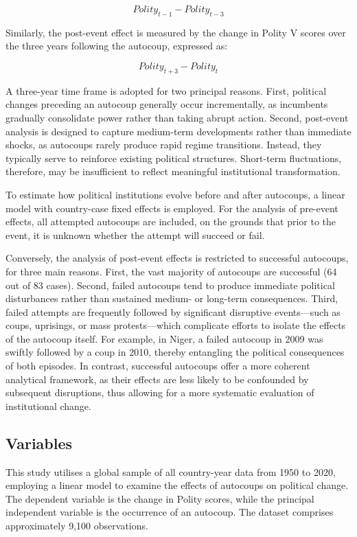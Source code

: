 \documentclass[
  12pt,
]{report}
\begin{document}
\[
Polity_{t-1} - Polity_{t-3}
\]

Similarly, the post-event effect is measured by the change in Polity V
scores over the three years following the autocoup, expressed as:

\[
Polity_{t+3} - Polity_t
\]

A three-year time frame is adopted for two principal reasons. First,
political changes preceding an autocoup generally occur incrementally,
as incumbents gradually consolidate power rather than taking abrupt
action. Second, post-event analysis is designed to capture medium-term
developments rather than immediate shocks, as autocoups rarely produce
rapid regime transitions. Instead, they typically serve to reinforce
existing political structures. Short-term fluctuations, therefore, may
be insufficient to reflect meaningful institutional transformation.

To estimate how political institutions evolve before and after
autocoups, a linear model with country-case fixed effects is employed.
For the analysis of pre-event effects, all attempted autocoups are
included, on the grounds that prior to the event, it is unknown whether
the attempt will succeed or fail.

Conversely, the analysis of post-event effects is restricted to
successful autocoups, for three main reasons. First, the vast majority
of autocoups are successful (64 out of 83 cases). Second, failed
autocoups tend to produce immediate political disturbances rather than
sustained medium- or long-term consequences. Third, failed attempts are
frequently followed by significant disruptive events---such as coups,
uprisings, or mass protests---which complicate efforts to isolate the
effects of the autocoup itself. For example, in Niger, a failed autocoup
in 2009 was swiftly followed by a coup in 2010, thereby entangling the
political consequences of both episodes. In contrast, successful
autocoups offer a more coherent analytical framework, as their effects
are less likely to be confounded by subsequent disruptions, thus
allowing for a more systematic evaluation of institutional change.

\subsection*{Variables}\label{variables}

This study utilises a global sample of all country-year data from 1950
to 2020, employing a linear model to examine the effects of autocoups on
political change. The dependent variable is the change in Polity scores,
while the principal independent variable is the occurrence of an
autocoup. The dataset comprises approximately 9,100 observations.
\end{document}
